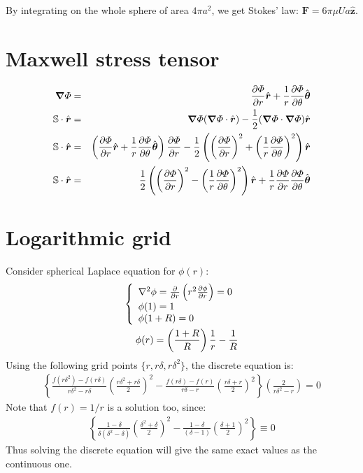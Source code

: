 \documentclass[11pt]{article}
\begin{document}
By integrating on the whole sphere of area $4\pi a^2$, we get Stokes' law:
$\boldsymbol{F} = 6\pi \mu U a \boldsymbol{\hat{z}}$.

\section{Maxwell stress tensor}
\begin{eqnarray}
\bnabla \varPhi &=& \deriv{\varPhi}{r} \brhat
+ \frac{1}{r} \deriv{\varPhi}{\theta} \bthetahat
\\
\mathbb{S} \cdot \brhat &=& \bnabla \varPhi (\bnabla \varPhi \cdot \brhat) -
\frac{1}{2} (\bnabla \varPhi \cdot \bnabla \varPhi) \brhat
\\
\mathbb{S} \cdot \brhat &=& \left(\deriv{\varPhi}{r} \brhat + \frac{1}{r} \deriv{\varPhi}{\theta}\bthetahat \right) \deriv{\varPhi}{r} -
\frac{1}{2} \left(\left(\deriv{\varPhi}{r}\right)^2 +
\left(\frac{1}{r} \deriv{\varPhi}{\theta} \right)^2 \right) \brhat
\\
\mathbb{S} \cdot \brhat &=&
\frac{1}{2} \left(\left(\deriv{\varPhi}{r}\right)^2 -
\left(\frac{1}{r} \deriv{\varPhi}{\theta} \right)^2\right) \brhat +
\frac{1}{r}\deriv{\varPhi}{r}\deriv{\varPhi}{\theta} \bthetahat
\end{eqnarray}

\section{Logarithmic grid}
Consider spherical Laplace equation for $\phi(r)$:
\begin{eqnarray}
 \brc{l}{\Laplacian \phi = \deriv{}{r}\left( r^2 \deriv{\phi}{r} \right) = 0 \\ \phi(1)=1 \\ \phi(1+R)=0} \\
 \phi(r) = \left(\frac{1+R}{R}\right)\frac{1}{r} -\frac{1}{R}
\end{eqnarray}
Using the following grid points $\{r, r\delta, r\delta^2\}$, the discrete equation is:
\begin{eqnarray}
\left\{
\frac{f(r\delta^2) - f(r\delta)}{r\delta^2 - r\delta}
\left(\frac{r\delta^2 + r\delta}{2}\right)^2
-
\frac{f(r\delta) - f(r)}{r\delta - r}
\left(\frac{r\delta + r}{2}\right)^2
\right\}
\left(\frac{2}{r\delta^2 - r}\right) = 0
\end{eqnarray}
Note that $f(r) = 1/r$ is a solution too, since:
\begin{eqnarray}
\left\{
\frac{1 - \delta}{\delta (\delta^2 - \delta)}
\left(\frac{\delta^2 + \delta}{2}\right)^2
-
\frac{1 - \delta}{(\delta - 1)}
\left(\frac{\delta + 1}{2}\right)^2
\right\} \equiv 0
\end{eqnarray}
Thus solving the discrete equation will give the same exact values as the continuous one.
\end{document}
